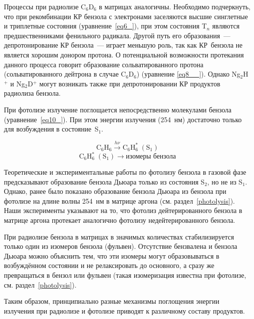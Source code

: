 {Процессы при радиолизе C$_6$D$_6$ в матрицах аналогичны.
Необходимо подчеркнуть, что при рекомбинации КР бензола с электронами заселяются высшие синглетные и триплетные состояния (уравнение~\ref{eq6_}), при этом состояния T$_n$ являются предшественниками фенильного радикала. Другой путь его образования~--- депротонирование КР бензола~--- играет меньшую роль, так как КР~бензола не является хорошим донором протона. О потенциальной возможности протекания данного процесса говорит образование сольватированного протона (сольватированного дейтрона в случае C$_6$D$_6$) (уравнение \ref{eq8__}). Однако Ng$_2$H$^+$ и Ng$_2$D$^+$ могут возникать также при депротонировании КР продуктов радиолиза бензола.

При фотолизе излучение поглощается непосредственно молекулами бензола (уравнение~\ref{eq10_}). При этом энергии излучения (254~нм) достаточно только для возбуждения в состояние~S$_1$.

\begin{equation}\label{eq10_}
\mathrm{C_6H_6} \xrightarrow{h\nu} \mathrm{C_6H_6^* \;(S_1)} 
\end{equation}
\begin{equation}\label{eq11_}
\mathrm{
C_6H_6^* \;(S_1) \to \text{изомеры бензола}}
\end{equation}

Теоретические и экспериментальные работы по фотолизу бензола в газовой фазе предсказывают образование бензола Дьюара только из состояния S$_2$, но не из S$_1$.  Однако, ранее было показано образование бензола Дьюара из бензола при фотолизе на длине волны 254~нм в матрице аргона (см. раздел~\ref{photolysis}). Наши эксперименты указывают на то, что фотолиз дейтерированного бензола в матрице аргона протекает аналогично фотолизу недейтерированного бензола.

При радиолизе бензола в матрицах в значимых количествах стабилизируется только один из изомеров бензола (фульвен). Отсутствие бензвалена и бензола Дьюара можно объяснить тем, что эти изомеры могут образовываться в возбуждённом состоянии и не релаксировать до основного, а сразу же превращаться в бензол или фульвен (такая изомеризация известна при фотолизе, см. раздел~\ref{photolysis}). 

Таким образом, принципиально разные механизмы поглощения энергии излучения при радиолизе и фотолизе приводят к различному составу продуктов.

}





















